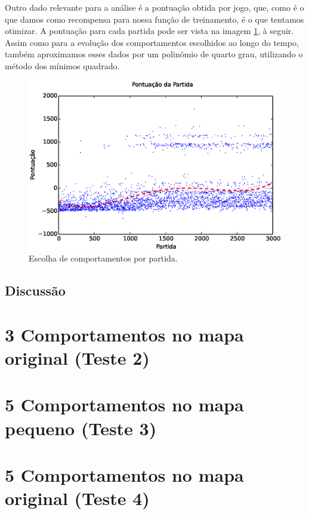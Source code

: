 Outro dado relevante para a análise é a pontuação obtida por jogo, que, como é o que damos como recompensa para nossa função de treinamento, é o que tentamos otimizar. A pontuação para cada partida pode ser vista na imagem \ref{img:3ComportamentosMapaPequeno:PontuacaoPorPartida}, à seguir. Assim como para a evolução dos comportamentos escolhidos ao longo do tempo, também aproximamos esses dados por um polinômio de quarto grau, utilizando o método dos mínimos quadrado.

\begin{figure}[H]
    \centering
    \includegraphics[width=\linewidth]{images/3_behaviors_small_map/match_scores____pol}
    \caption{Escolha de comportamentos por partida.}
    \label{img:3ComportamentosMapaPequeno:PontuacaoPorPartida}
\end{figure}


\subsection{Discussão}



\section{3 Comportamentos no mapa original (Teste 2)}
\section{5 Comportamentos no mapa pequeno (Teste 3)}
\section{5 Comportamentos no mapa original (Teste 4)}
